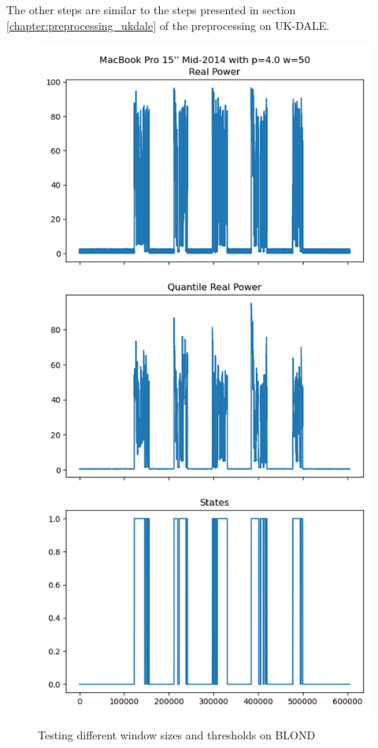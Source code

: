 \documentclass[sigconf]{acmart}
\begin{document}
The other steps are similar to the steps presented in section \ref{chapter:preprocessing_ukdale} of the preprocessing on UK-DALE.

\begin{figure}
  \caption{Testing different window sizes and thresholds on BLOND}
  \includegraphics[scale=0.5]{figures/window.png}
  \label{fig:window_blond}
\end{figure}
\end{document}
